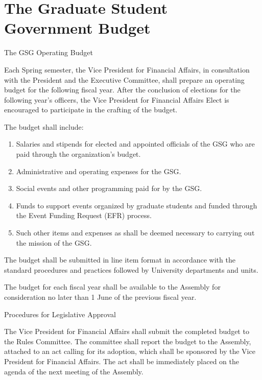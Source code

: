 \section{The Graduate Student Government Budget}
\begin{bylaws-number}
  \item The GSG Operating Budget
  \begin{bylaws-number}
    \item Each Spring semester, the Vice President for Financial Affairs, in consultation with the President and the Executive Committee, shall prepare an operating budget for the following fiscal year. After the conclusion of elections for the following year’s officers, the Vice President for Financial Affairs Elect is encouraged to participate in the crafting of the budget.
    \item The budget shall include:
    \begin{enumerate}[i]
      \item Salaries and stipends for elected and appointed officials of the GSG who are paid through the organization’s budget.
      \item Administrative and operating expenses for the GSG.
      \item Social events and other programming paid for by the GSG.
      \item Funds to support events organized by graduate students and funded through the Event Funding Request (EFR) process.
      \item Such other items and expenses as shall be deemed necessary to carrying out the mission of the GSG.
    \end{enumerate}
    \item The budget shall be submitted in line item format in accordance with the standard procedures and practices followed by University departments and units.
    \item The budget for each fiscal year shall be available to the Assembly for consideration no later than 1 June of the previous fiscal year.
  \end{bylaws-number}
  \item Procedures for Legislative Approval
  \begin{bylaws-number}
    \item The Vice President for Financial Affairs shall submit the completed budget to the Rules Committee. The committee shall report the budget to the Assembly, attached to an act calling for its adoption, which shall be sponsored by the Vice President for Financial Affairs. The act shall be immediately placed on the agenda of the next meeting of the Assembly.

\end{bylaws-number}
\end{bylaws-number}
